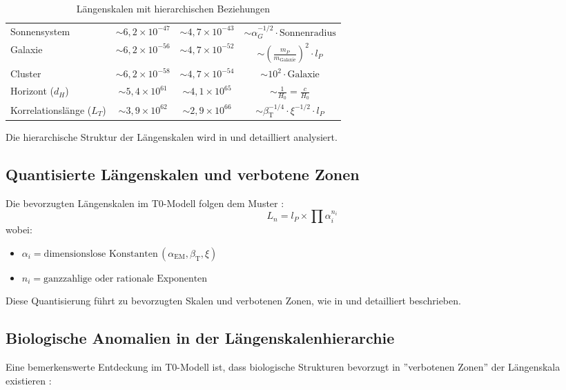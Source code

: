 \documentclass[12pt,a4paper]{article}
\newcommand{\alphaEM}{\alpha_{\text{EM}}}
\newcommand{\betaT}{\beta_{\text{T}}}
\begin{document}
\begin{table}[H]
\begin{adjustbox}{width=\textwidth}
\begin{tabular}{lccc}
			Sonnensystem & \(\sim 6,2 \times 10^{-47}\) & \(\sim 4,7 \times 10^{-43}\) & \(\sim \alpha_G^{-1/2} \cdot \text{Sonnenradius}\) \\
			Galaxie & \(\sim 6,2 \times 10^{-56}\) & \(\sim 4,7 \times 10^{-52}\) & \(\sim \left(\frac{m_P}{m_{\mathrm{Galaxie}}}\right)^2 \cdot l_P\) \\
			Cluster & \(\sim 6,2 \times 10^{-58}\) & \(\sim 4,7 \times 10^{-54}\) & \(\sim 10^2 \cdot \text{Galaxie}\) \\
			Horizont (\(d_H\)) & \(\sim 5,4 \times 10^{61}\) & \(\sim 4,1 \times 10^{65}\) & \(\sim \frac{1}{H_0} = \frac{c}{H_0}\) \\
			Korrelationslänge (\(L_T\)) & \(\sim 3,9 \times 10^{62}\) & \(\sim 2,9 \times 10^{66}\) & \(\sim \betaT^{-1/4} \cdot \xi^{-1/2} \cdot l_P\) \\
			\bottomrule
		\end{tabular}
	\end{adjustbox}
	\caption{Längenskalen mit hierarchischen Beziehungen}
	\label{tab:length_scales}
\end{table}

Die hierarchische Struktur der Längenskalen wird in \cite{pascher_galaxies_2025} und \cite{pascher_nateinhsystem_2025} detailliert analysiert.

\subsection*{Quantisierte Längenskalen und verbotene Zonen}

Die bevorzugten Längenskalen im T0-Modell folgen dem Muster \cite{pascher_planck_2025}:
\[
L_n = l_P \times \prod \alpha_i^{n_i}
\]
wobei:
\begin{itemize}
	\item \(\alpha_i = \text{dimensionslose Konstanten} \, (\alphaEM, \betaT, \xi)\)
	\item \(n_i = \text{ganzzahlige oder rationale Exponenten}\)
\end{itemize}

Diese Quantisierung führt zu bevorzugten Skalen und verbotenen Zonen, wie in \cite{pascher_planck_2025} und \cite{pascher_quantum_2025} detailliert beschrieben.

\subsection*{Biologische Anomalien in der Längenskalenhierarchie}

Eine bemerkenswerte Entdeckung im T0-Modell ist, dass biologische Strukturen bevorzugt in ''verbotenen Zonen'' der Längenskala existieren \cite{pascher_quantum_2025, pascher_bio_2025}:
\end{document}
